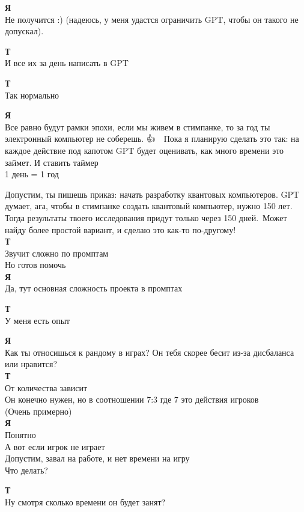 \textbf{Я}\\
Не получится :) (надеюсь, у меня удастся ограничить GPT, чтобы он такого не допускал).

\textbf{Т}\\
И все их за день написать в GPT

\textbf{Т}\\
Так нормально

\textbf{Я}\\
Все равно будут рамки эпохи, если мы живем в стимпанке, то за год ты электронный компьютер не соберешь. 👍👨‍💻\
Пока я планирую сделать это так: на каждое действие под капотом GPT будет оценивать, как много времени это займет. И ставить таймер\\
1 день = 1 год

Допустим, ты пишешь приказ: начать разработку квантовых компьютеров. GPT думает, ага, чтобы в стимпанке создать квантовый компьютер, нужно 150 лет. Тогда результаты твоего исследования придут только через 150 дней.\
Может найду более простой вариант, и сделаю это как-то по-другому!\\

\textbf{Т}\\
Звучит сложно по промптам\\
Но готов помочь\\

\textbf{Я}\\
Да, тут основная сложность проекта в промптах

\textbf{Т}\\
У меня есть опыт

\textbf{Я}\\
Как ты относишься к рандому в играх? Он тебя скорее бесит из-за дисбаланса или нравится?\\

\textbf{Т}\\
От количества зависит\\
Он конечно нужен, но в соотношении 7:3 где 7 это действия игроков\\
(Очень примерно)\\

\textbf{Я}\\
Понятно\\
А вот если игрок не играет\\
Допустим, завал на работе, и нет времени на игру\\
Что делать?

\textbf{Т}\\
Ну смотря сколько времени он будет занят?

